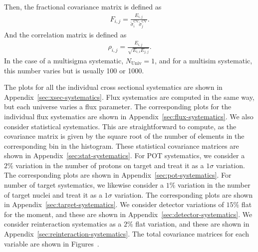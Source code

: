 \documentclass{article}
\begin{document}

Then, the fractional covariance matrix is defined as 
\begin{align}
    F_{i,j} = \frac{E_{i,j}}{\tilde{\sigma}_i^\text{CV} \tilde{\sigma}_j^\text{CV}}.
\end{align}
And the correlation matrix is defined as
\begin{align}
    \rho_{i,j} = \frac{E_{i,j}}{\sqrt{E_{i,i} E_{j,j}}}.
\end{align}
In the case of a multisigma systematic, $N_{\text{Univ}} = 1$, and for a multisim systematic, this number varies but is usually 
100 or 1000.

The plots for all the individual cross sectional systematics are shown in Appendix~\ref{sec:xsec-systematics}. 
Flux systematics are computed in the same way, but each universe varies a flux parameter.
The corresponding plots for the individual flux systematics are shown in Appendix~\ref{sec:flux-systematics}.
We also consider statistical systematics. This are straightforward to compute, as the covariance matrix 
is given by the square root of the number of elements in the corresponding bin in the histogram. These statistical
covariance matrices are shown in Appendix~\ref{sec:stat-systematics}.
For POT systematics, we consider a $2\%$ variation in the number of protons on target and treat it as a 
$1\sigma$ variation. The corresponding plots are shown in Appendix~\ref{sec:pot-systematics}.
For number of target systematics, we likewise consider a $1\%$ variation in the number of target nuclei and treat it as a
$1\sigma$ variation. The corresponding plots are shown in Appendix~\ref{sec:target-systematics}.
We consider detector variations of $15\%$ flat for the moment, and these are shown in Appendix~\ref{sec:detector-systematics}.
We consider reinteraction systematics as a $2\%$ flat variation, and these are shown in Appendix~\ref{sec:reinteraction-systematics}.
The total covariance matrices for each variable are shown in Figures~.
\end{document}
